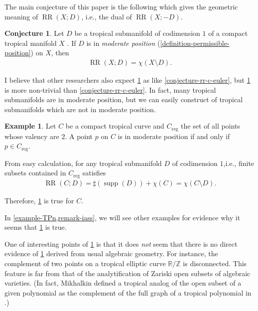 \documentclass[a4paper,dvipdfmx,reqno,12pt]{amsart}
\theoremstyle{definition}
\newtheorem{example}[theorem]{Example}
\newtheorem{conjecture}[theorem]{Conjecture}
\newcommand{\opn}[1]{\operatorname{#1}}
\numberwithin{equation}{section}
\begin{document}
The main conjecture of this paper is the following 
which gives
the geometric meaning of $\opn{RR}(X;D)$, i.e.,
the dual of $\opn{RR}(X;-D)$.

\begin{conjecture}
\label{conjecture-rr-euler}
Let $D$ be a tropical submanifold of codimension 
$1$ of a compact tropical manifold $X$
\cite[Definition 2.14]{demedrano2023chern}.
If $D$ is in \emph{moderate position}
(\cref{definition-permissible-position}) on $X$,
then 
\begin{align}
\opn{RR}(X;D)=\chi(X\setminus D).
\end{align}
\end{conjecture}
I believe that other researchers also expect
\cref{conjecture-rr-euler} as like
\cref{conjecture-rr-c-euler},
but \cref{conjecture-rr-euler} is more non-trivial than
\cref{conjecture-rr-c-euler}.
In fact, many tropical submanifolds are in moderate position,
but we can easily construct of tropical submanifolds
which are not in moderate position.

\begin{example}
\label{example-permissible-point}
Let $C$ be a compact tropical curve 
and $C_{\mathrm{reg}}$ the set of all
points whose valency are $2$.
A point $p$ on $C$ is in moderate position
if and only if $p\in C_{\mathrm{reg}}$.

From easy calculation, for any 
tropical submanifold $D$ of codimension $1$,i.e.,
finite subsets contained in $C_{\mathrm{reg}}$ 
satisfies
\begin{align}
\opn{RR}(C;D)=\sharp (\opn{supp}(D))+ \chi(C)
=\chi(C\setminus D).
\end{align}

Therefore, \cref{conjecture-rr-euler} is true
for $C$.
\end{example}
In \cref{example-TPn,remark-iass},
we will see other examples for evidence 
why it seems that \cref{conjecture-rr-euler}
is true.

One of interesting points of
\cref{conjecture-rr-euler} is that
it does \emph{not} seem that there is
no direct evidence of \cref{conjecture-rr-euler}
derived from usual algebraic geometry.  
For instance, the complement of two points 
on a tropical elliptic curve
$\mathbb{R}/\mathbb{Z}$ is disconnected.
This feature is far from that of the analytification of Zariski open subsets of
algebraic varieties.
(In fact, Mikhalkin defined
a tropical analog of the open subset of
a given polynomial as the complement of
the full graph \cite[]{MR2275625}
of a tropical polynomial in
\cite[Remark 3.5 and Example 3.6]{MR2275625}.)
\end{document}
